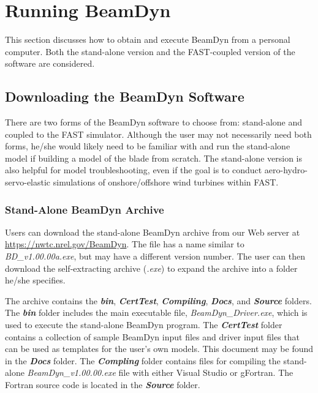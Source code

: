 \chapter{Running BeamDyn}
\label{sec:Run}
This section discusses how to obtain and execute BeamDyn from a personal computer. 
Both the stand-alone version and the FAST-coupled version of the software are considered.

\section{Downloading the BeamDyn Software}
There are two forms of the BeamDyn software to choose from: stand-alone and coupled to the FAST simulator. 
Although the user may not necessarily need both forms, he/she would likely need to be familiar with and run the stand-alone model if building a model of the blade from scratch. 
The stand-alone version is also helpful for model troubleshooting, even if the goal is to conduct aero-hydro-servo-elastic simulations of onshore/offshore wind turbines within FAST. 

\subsection{Stand-Alone BeamDyn Archive}
Users can download the stand-alone BeamDyn archive from our Web server at \url{https://nwtc.nrel.gov/BeamDyn}. 
The file has a name similar to {\it BD\_v1.00.00a.exe}, but may have a different version number. The user can then download the self-extracting archive ({\it .exe}) to expand the archive into a folder he/she specifies.


The archive contains the \textbf{\textit{bin}}, \textbf{\textit{CertTest}}, \textbf{\textit{Compiling}}, \textbf{\textit{Docs}}, and \textbf{\textit{Source}} folders. 
The \textbf{\textit{bin}} folder includes the main executable file, \textit{BeamDyn\_Driver.exe}, which is used to execute the stand-alone BeamDyn program. 
The \textbf{\textit{CertTest}} folder contains a collection of sample BeamDyn input files and driver input files that can be used as templates for the user's own models. 
This document may be found in the \textbf{\textit{Docs}} folder. 
The \textbf{\textit{Compling}} folder contains files for compiling the stand-alone \textit{BeamDyn\_v1.00.00.exe} file with either Visual Studio or gFortran. 
The Fortran source code is located in the \textbf{\textit{Source}} folder.


